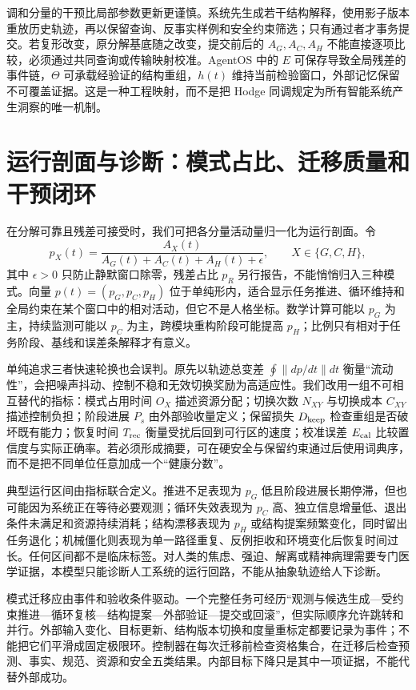 调和分量的干预比局部参数更新更谨慎。系统先生成若干结构解释，使用影子版本重放历史轨迹，再以保留查询、反事实样例和安全约束筛选；只有通过者才事务提交。若复形改变，原分解基底随之改变，提交前后的 $A_G,A_C,A_H$ 不能直接逐项比较，必须通过共同查询或传输映射校准。AgentOS 中的 $E$ 可保存导致全局残差的事件链，$\Theta$ 可承载经验证的结构重组，$h(t)$ 维持当前检验窗口，外部记忆保留不可覆盖证据。这是一种工程映射，而不是把 Hodge 同调规定为所有智能系统产生洞察的唯一机制。

\section{运行剖面与诊断：模式占比、迁移质量和干预闭环}
\label{sec:section_9005}

在分解可靠且残差可接受时，我们可把各分量活动量归一化为运行剖面。令
\[
 p_X(t)=\frac{A_X(t)}{A_G(t)+A_C(t)+A_H(t)+\epsilon},
 \qquad X\in\{G,C,H\},
\]
其中 $\epsilon>0$ 只防止静默窗口除零，残差占比 $p_R$ 另行报告，不能悄悄归入三种模式。向量 $p(t)=(p_G,p_C,p_H)$ 位于单纯形内，适合显示任务推进、循环维持和全局约束在某个窗口中的相对活动，但它不是人格坐标。数学计算可能以 $p_G$ 为主，持续监测可能以 $p_C$ 为主，跨模块重构阶段可能提高 $p_H$；比例只有相对于任务阶段、基线和误差条解释才有意义。

单纯追求三者快速轮换也会误判。原先以轨迹总变差 $\oint\|dp/dt\|dt$ 衡量“流动性”，会把噪声抖动、控制不稳和无效切换奖励为高适应性。我们改用一组不可相互替代的指标：模式占用时间 $O_X$ 描述资源分配；切换次数 $N_{XY}$ 与切换成本 $C_{XY}$ 描述控制负担；阶段进展 $P_s$ 由外部验收量定义；保留损失 $D_{\rm keep}$ 检查重组是否破坏既有能力；恢复时间 $T_{\rm rec}$ 衡量受扰后回到可行区的速度；校准误差 $E_{\rm cal}$ 比较置信度与实际正确率。若必须形成摘要，可在硬安全与保留约束通过后使用词典序，而不是把不同单位任意加成一个“健康分数”。

典型运行区间由指标联合定义。推进不足表现为 $p_G$ 低且阶段进展长期停滞，但也可能因为系统正在等待必要观测；循环失效表现为 $p_C$ 高、独立信息增量低、退出条件未满足和资源持续消耗；结构漂移表现为 $p_H$ 或结构提案频繁变化，同时留出任务退化；机械僵化则表现为单一路径重复、反例拒收和环境变化后恢复时间过长。任何区间都不是临床标签。对人类的焦虑、强迫、解离或精神病理需要专门医学证据，本模型只能诊断人工系统的运行回路，不能从抽象轨迹给人下诊断。

模式迁移应由事件和验收条件驱动。一个完整任务可经历“观测与候选生成—受约束推进—循环复核—结构提案—外部验证—提交或回滚”，但实际顺序允许跳转和并行。外部输入变化、目标更新、结构版本切换和度量重标定都要记录为事件；不能把它们平滑成固定极限环。控制器在每次迁移前检查资格集合，在迁移后检查预测、事实、规范、资源和安全五类结果。内部目标下降只是其中一项证据，不能代替外部成功。


